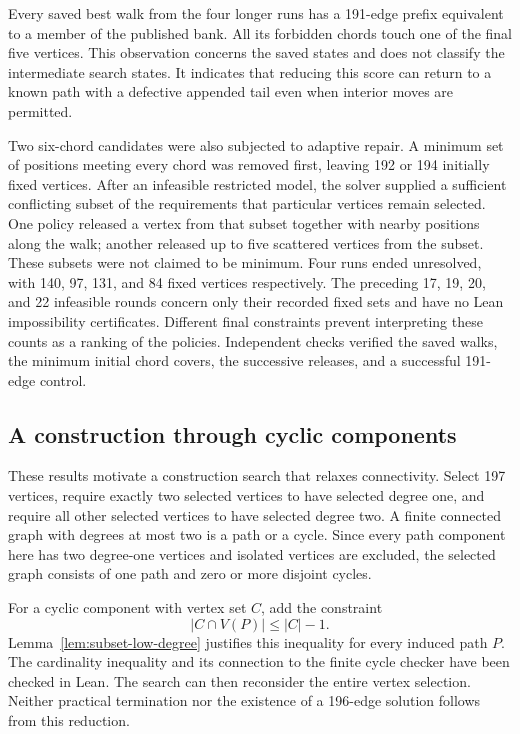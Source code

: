 \documentclass[11pt,a4paper]{article}
\theoremstyle{definition}
\theoremstyle{remark}
\begin{document}
Every saved best walk from the four longer runs has a 191-edge prefix equivalent to a member of the published bank. All its forbidden chords touch one of the final five vertices. This observation concerns the saved states and does not classify the intermediate search states. It indicates that reducing this score can return to a known path with a defective appended tail even when interior moves are permitted.

Two six-chord candidates were also subjected to adaptive repair. A minimum set of positions meeting every chord was removed first, leaving 192 or 194 initially fixed vertices. After an infeasible restricted model, the solver supplied a sufficient conflicting subset of the requirements that particular vertices remain selected. One policy released a vertex from that subset together with nearby positions along the walk; another released up to five scattered vertices from the subset. These subsets were not claimed to be minimum. Four runs ended unresolved, with 140, 97, 131, and 84 fixed vertices respectively. The preceding 17, 19, 20, and 22 infeasible rounds concern only their recorded fixed sets and have no Lean impossibility certificates. Different final constraints prevent interpreting these counts as a ranking of the policies. Independent checks verified the saved walks, the minimum initial chord covers, the successive releases, and a successful 191-edge control.

\subsection{A construction through cyclic components}
These results motivate a construction search that relaxes connectivity. Select 197 vertices, require exactly two selected vertices to have selected degree one, and require all other selected vertices to have selected degree two. A finite connected graph with degrees at most two is a path or a cycle. Since every path component here has two degree-one vertices and isolated vertices are excluded, the selected graph consists of one path and zero or more disjoint cycles.

For a cyclic component with vertex set $C$, add the constraint
\[
|C\cap V(P)|\le |C|-1.
\]
Lemma~\ref{lem:subset-low-degree} justifies this inequality for every induced path $P$. The cardinality inequality and its connection to the finite cycle checker have been checked in Lean. The search can then reconsider the entire vertex selection. Neither practical termination nor the existence of a 196-edge solution follows from this reduction.
\end{document}
